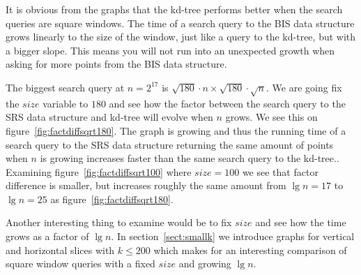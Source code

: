 It is obvious from the graphs that the kd-tree performs better when the search queries are square windows. The time of a search query to the BIS data structure grows linearly to the size of the window, just like a query to the kd-tree, but with a bigger slope. This means you will not run into an unexpected growth when asking for more points from the BIS data structure.

The biggest search query at $n = 2^{17}$ is $\sqrt{180}\cdot{n} \times \sqrt{180}\cdot\sqrt{n}$. We are going fix the $size$ variable to $180$ and see how the factor between the search query to the SRS data structure and kd-tree will evolve when $n$ grows. We see this on figure~\ref{fig:factdiffsqrt180}. The graph is growing and thus the running time of a search query to the SRS data structure returning the same amount of points when $n$ is growing increases faster than the same search query to the kd-tree.. Examining figure~\ref{fig:factdiffsqrt100} where $size = 100$ we see that factor difference is smaller, but increases roughly the same amount from $\lg n = 17$ to $\lg n = 25$ as figure~\ref{fig:factdiffsqrt180}. 

Another interesting thing to examine would be to fix $size$ and see how the time grows as a factor of $\lg n$. In section~\ref{sect:smallk} we introduce graphs for vertical and horizontal slices with $k \leq 200$ which makes for an interesting comparison of square window queries with a fixed $size$ and growing $\lg n$. 


